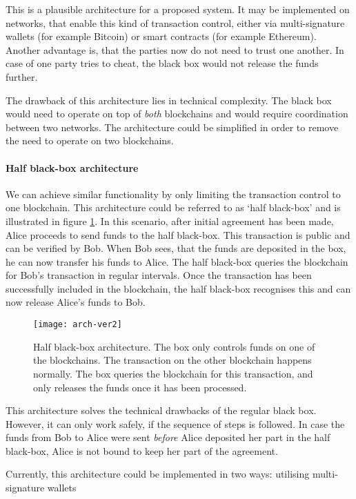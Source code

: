 This is a plausible architecture for a proposed system. It may be implemented on networks, that enable this kind of transaction control, either via multi-signature wallets (for example Bitcoin) or smart contracts (for example Ethereum). Another advantage is, that the parties now do not need to trust one another. In case of one party tries to cheat, the black box would not release the funds further.

The drawback of this architecture lies in technical complexity. The black box would need to operate on top of \textit{both} blockchains and would require coordination between two networks. The architecture could be simplified in order to remove the need to operate on two blockchains.

\paragraph{Half black-box architecture}
We can achieve similar functionality by only limiting the transaction control to one blockchain. This architecture could be referred to as `half black-box' and is illustrated in figure \ref{fig:arch-ver2}. In this scenario, after initial agreement has been made, Alice proceeds to send funds to the half black-box. This transaction is public and can be verified by Bob. When Bob sees, that the funds are deposited in the box, he can now transfer his funds to Alice. The half black-box queries the blockchain for Bob's transaction in regular intervals. Once the transaction has been successfully included in the blockchain, the half black-box recognises this and can now release Alice's funds to Bob.
% 
\begin{figure}[ht]
    \centering
    \texttt{[image: arch-ver2]}
    \caption{Half black-box architecture. The box only controls funds on one of the blockchains. The transaction on the other blockchain happens normally. The box queries the blockchain for this transaction, and only releases the funds once it has been processed.}
    \label{fig:arch-ver2}
\end{figure}

This architecture solves the technical drawbacks of the regular black box. However, it can only work safely, if the sequence of steps is followed. In case the funds from Bob to Alice were sent \textit{before} Alice deposited her part in the half black-box, Alice is not bound to keep her part of the agreement.

Currently, this architecture could be implemented in two ways: utilising multi-signature wallets

